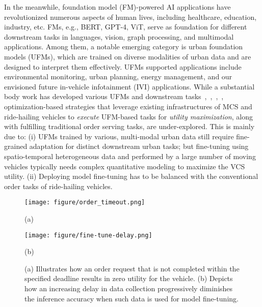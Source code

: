  In the meanwhile, foundation model (FM)-powered AI applications have revolutionized numerous aspects of human lives, including healthcare, education, industry, etc. FMs, e.g., BERT, GPT-4, ViT, serve as foundation for different downstream tasks in languages, vision, graph processing, and multimodal applications. Among them, a notable emerging category is urban foundation models (UFMs), which are trained on diverse modalities of urban data and are designed to interpret them effectively. UFMs supported applications include environmental monitoring, urban planning, energy management, and our envisioned future in-vehicle infotainment (IVI) applications\cite{you2024raccoon}. %
While a substantial body work has developed various UFMs and downstream tasks~\cite{zhang2024urban},~\cite{mai2023opportunities},~\cite{lu2024ai},~\cite{gao2024survey},
optimization-based strategies that leverage existing infrastructures of MCS and ride-hailing vehicles to {\em execute} UFM-based tasks for {\em utility maximization}, along with fulfilling traditional order serving tasks, are under-explored. This is mainly due to: (i) UFMs trained by various, multi-modal urban data still require fine-grained adaptation for distinct downstream urban tasks; but fine-tuning using spatio-temporal heterogeneous data and performed by a large number of moving vehicles typically needs complex quantitative modeling to maximize the VCS utility. (ii) Deploying model fine-tuning has to be balanced with the conventional order tasks of ride-hailing vehicles. %

\begin{figure}[ht]
\centering
\begin{minipage}[t]{0.48\linewidth}
  \centering
  \texttt{[image: figure/order\_timeout.png]}
  \caption*{(a)}  %
\end{minipage}%
\hfill
\begin{minipage}[t]{0.48\linewidth}
  \centering
  \texttt{[image: figure/fine-tune-delay.png]}
  \caption*{(b)}  %
\end{minipage}
\caption{
(a) Illustrates how an order request that is not completed within the specified deadline results in zero utility for the vehicle.
(b) Depicts how an increasing delay in data collection progressively diminishes the inference accuracy when such data is used for model fine-tuning.}
\label{fig:impact_on_model}
\end{figure}


